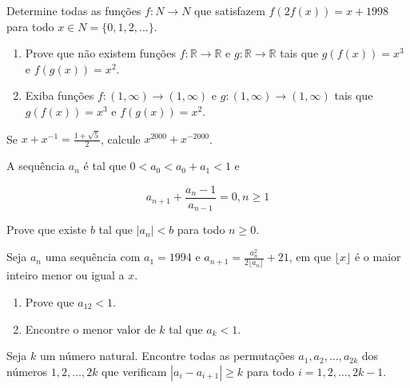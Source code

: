\begin{questao}
  Determine todas as funções $f: N \rightarrow N$ que satisfazem $f(2f(x)) = x +
  1998$ para todo $x \in N = \{0,1,2,\ldots\}$.
\end{questao}

\begin{questao}

  \begin{enumerate}

  \item Prove que não existem funções $f: \mathbb{R} \rightarrow \mathbb{R}$ e
    $g: \mathbb{R} \rightarrow \mathbb{R}$ tais que $g(f(x)) = x^3$ e $f(g(x))
    = x^2$.

  \item Exiba funções $f: (1,\infty) \rightarrow (1,\infty)$ e $g: (1,\infty)
    \rightarrow (1,\infty)$ tais que $g(f(x)) = x^3$ e $f(g(x)) = x^2$.
  \end{enumerate}

\end{questao}

\begin{questao}
  Se $x+x^{-1}=\frac{1+\sqrt{5}}{2}$, calcule $x^{2000}+x^{-2000}$.
\end{questao}

\begin{questao}
  A sequência $a_n$ é tal que $0 < a_0 < a_0+a_1 < 1$ e

  $$ a_{n+1}+\frac{a_n-1}{a_{n-1}} = 0, n \geq 1$$

  Prove que existe $b$ tal que $|a_n|<b$ para todo $n \geq 0$.
\end{questao}

\begin{questao}
  Seja $a_n$ uma sequência com $a_1=1994$ e $a_{n+1} = \frac{a_n^2}{2\lfloor a_n
    \rfloor}+21$, em que $\lfloor x \rfloor$ é o maior inteiro menor ou igual a
  $x$.

  \begin{enumerate}

  \item Prove que $a_{12}<1$.

  \item Encontre o menor valor de $k$ tal que $a_k < 1$.
  \end{enumerate}

\end{questao}

\begin{questao}
  Seja $k$ um número natural. Encontre todas as permutações
  $a_1,a_2,\ldots,a_{2k}$ dos números $1,2,\ldots,2k$ que verificam
  $|a_i-a_{i+1}| \geq k$ para todo $i=1,2,\ldots,2k-1$.
\end{questao}

